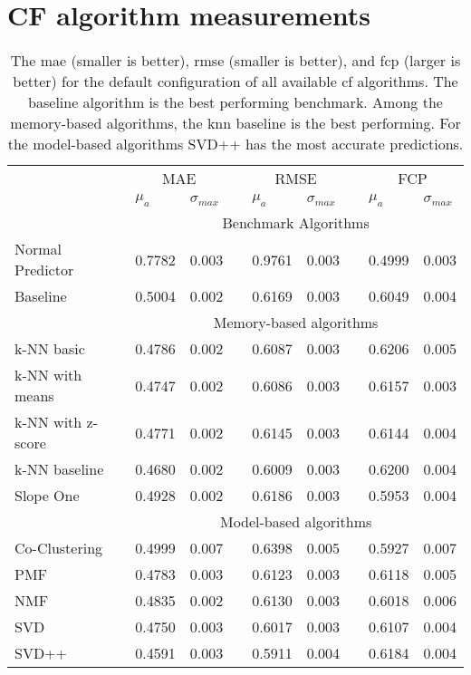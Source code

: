 \chapter{CF algorithm measurements}
\label{app:its-metrics}

\begin{sidewaystable}
    \centering
    \caption[Comparison of default configurations for all CF algorithms]{The \gls{mae} (smaller is better), \gls{rmse} (smaller is better), and \gls{fcp} (larger is better) for the default configuration of all available \gls{cf} algorithms. The baseline algorithm is the best performing benchmark. Among the memory-based algorithms, the \gls{knn} baseline is the best performing. For the model-based algorithms SVD++ has the most accurate predictions.}
    \begin{tabular}{l ll l ll l ll}
                 & \multicolumn{2}{c}{MAE} &&
                 \multicolumn{2}{c}{RMSE} &&
                 \multicolumn{2}{c}{FCP} \\
    \cline{2-3} \cline{5-6} \cline{8-9}
    & $\mu_a$ & $\sigma_{max}$ && $\mu_a$ & $\sigma_{max}$ && $\mu_a$ & $\sigma_{max}$ \\
    \hline
    &\multicolumn{8}{c}{\textsf{Benchmark Algorithms}}\\
    \hline
    Normal Predictor & 0.7782 & 0.003 && 0.9761 & 0.003 && 0.4999 & 0.003\\
    Baseline         &  \textcolor{scw-teal-darker}{0.5004} & 0.002 && 0.6169 & 0.003 && 0.6049 & 0.004\\
    \hline
    &\multicolumn{8}{c}{\textsf{Memory-based algorithms}}\\
    \hline
    k-NN basic       & 0.4786 & 0.002 && 0.6087 & 0.003 && 0.6206 & 0.005\\
    k-NN with means  & 0.4747 & 0.002 && 0.6086 & 0.003 && 0.6157 & 0.003\\
    k-NN with z-score& 0.4771 & 0.002 && 0.6145 & 0.003 && 0.6144 & 0.004\\
    k-NN baseline    & \textcolor{scw-teal-darker}{0.4680} & 0.002 && 0.6009 & 0.003 && 0.6200 & 0.004\\
    Slope One        & 0.4928 & 0.002 && 0.6186 & 0.003 && 0.5953 & 0.004\\
    \hline
    &\multicolumn{8}{c}{\textsf{Model-based algorithms}}\\
    \hline
    Co-Clustering    & 0.4999 & 0.007 && 0.6398 & 0.005 && 0.5927 & 0.007\\
    PMF              & 0.4783 & 0.003 && 0.6123 & 0.003 && 0.6118 & 0.005 \\
    NMF              & 0.4835 & 0.002 && 0.6130 & 0.003 && 0.6018 & 0.006 \\
    SVD              & 0.4750 & 0.003 && 0.6017 & 0.003 && 0.6107 & 0.004 \\
    SVD++            & \textcolor{scw-teal-darker}{0.4591} & 0.003 && 0.5911 & 0.004 && 0.6184 & 0.004 \\
    \end{tabular}
\end{sidewaystable}

